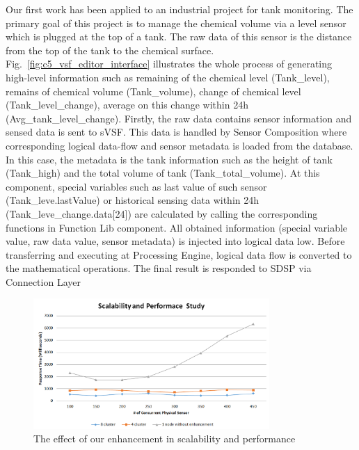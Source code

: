 Our first work has been applied to an industrial project for tank monitoring. The primary goal of this project is to manage the chemical volume via a level sensor which is plugged at the top of a tank.  The raw data of this sensor is the distance from the top of the tank to the chemical surface. Fig.~\ref{fig:c5_vsf_editor_interface} illustrates the whole process of generating high-level information such as remaining of the chemical level (Tank\_level), remains of chemical volume (Tank\_volume), change of chemical level (Tank\_level\_change), average on this change within 24h (Avg\_tank\_level\_change). Firstly, the raw data contains sensor information and sensed data is sent to sVSF. This data is handled by Sensor Composition where corresponding logical data-flow and sensor metadata is loaded from the database. In this case, the metadata is the tank information such as the height of tank (Tank\_high) and the total volume of tank (Tank\_total\_volume). At this component, special variables such as last value of such sensor (Tank\_leve.lastValue) or historical sensing data within 24h (Tank\_leve\_change.data[24]) are calculated by calling the corresponding functions in Function Lib component. All obtained information (special variable value, raw data value, sensor metadata) is injected into logical data low. Before transferring and executing at Processing Engine, logical data flow is converted to the mathematical operations. The final result is responded to SDSP via Connection Layer\\

\begin{figure}[h!] 
 \begin{center} 
 \includegraphics[width=0.8\textwidth]{./Part2/Chapter5/figures/vsf_scalability.png} 
    \caption{The effect of our enhancement in scalability and performance}
     \label{fig:c5_vsf_scalability}
  \end{center} 
\end{figure}

